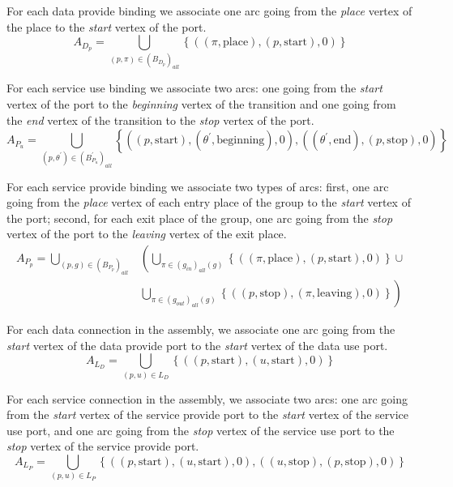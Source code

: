 For each data provide binding we associate one arc going from the
\emph{place} vertex of the place to the \emph{start} vertex of the
port. 
\[
A_{D_{p}}=\bigcup_{\left(p,\pi\right)\in\left(B_{D_{p}}\right)_{all}}\left\{ \left(\left(\pi,\text{place}\right),\left(p,\text{start}\right),0\right)\right\} 
\]

For each service use binding we associate two arcs: one going from
the \emph{start} vertex of the port to the \emph{beginning} vertex
of the transition and one going from the \emph{end} vertex of the
transition to the \emph{stop} vertex of the port. 
\[
A_{P_{u}}=\bigcup_{\left(p,\theta^{\prime}\right)\in\left(B_{P_{u}}^{\prime}\right)_{all}}\left\{ \left(\left(p,\text{start}\right),\left(\theta^{\prime},\text{beginning}\right),0\right),\left(\left(\theta^{\prime},\text{end}\right),\left(p,\text{stop}\right),0\right)\right\} 
\]

For each service provide binding we associate two types of arcs: first,
one arc going from the \emph{place} vertex of each entry place of
the group to the \emph{start} vertex of the port; second, for each
exit place of the group, one arc going from the \emph{stop} vertex
of the port to the \emph{leaving} vertex of the exit place. 
\begin{align*}
A_{P_{p}}=\bigcup_{\left(p,g\right)\in\left(B_{P_{p}}\right)_{all}} & \left( \bigcup_{\pi\in\left(g_{in}\right)_{all}\left(g\right)}\left\{ \left(\left(\pi,\text{place}\right),\left(p,\text{start}\right),0\right)\right\} \cup \right. \\
 & \left. \bigcup_{\pi\in\left(g_{out}\right)_{all}\left(g\right)}\left\{ \left(\left(p,\text{stop}\right),\left(\pi,\text{leaving}\right),0\right)\right\} \right)
\end{align*}

For each data connection in the assembly, we associate one arc going
from the \emph{start} vertex of the data provide port to the \emph{start}
vertex of the data use port. 
\[
A_{L_{D}}=\bigcup_{\left(p,u\right)\in L_{D}}\left\{ \left(\left(p,\text{start}\right),\left(u,\text{start}\right),0\right)\right\} 
\]

For each service connection in the assembly, we associate two arcs:
one arc going from the \emph{start} vertex of the service provide
port to the \emph{start} vertex of the service use port, and one arc
going from the \emph{stop} vertex of the service use port to the \emph{stop}
vertex of the service provide port. 
\[
A_{L_{P}}=\bigcup_{\left(p,u\right)\in L_{P}}\left\{ \left(\left(p,\text{start}\right),\left(u,\text{start}\right),0\right),\left(\left(u,\text{stop}\right),\left(p,\text{stop}\right),0\right)\right\} 
\]

